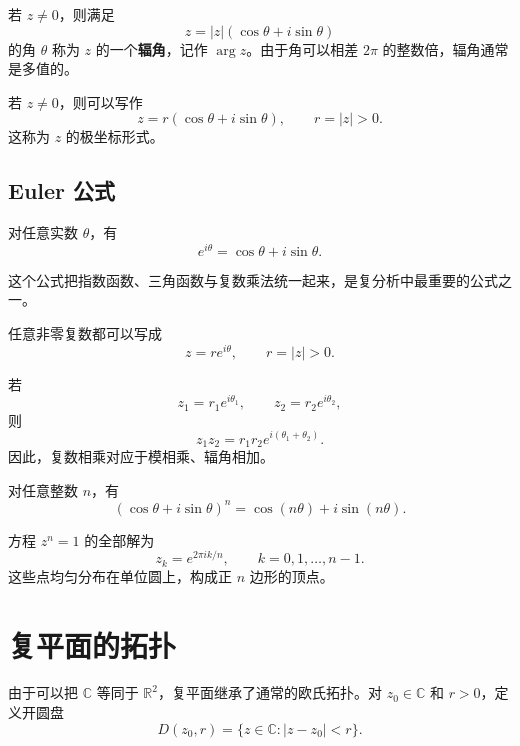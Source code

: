 \begin{definition}[辐角]
若 $z\ne0$，则满足
\[
    z=|z|(\cos\theta+i\sin\theta)
\]
的角 $\theta$ 称为 $z$ 的一个\textbf{辐角}，记作 $\arg z$。由于角可以相差 $2\pi$ 的整数倍，辐角通常是多值的。
\end{definition}

\begin{definition}[极坐标形式]
若 $z\ne0$，则可以写作
\[
    z=r(\cos\theta+i\sin\theta),
    \qquad r=|z|>0.
\]
这称为 $z$ 的极坐标形式。
\end{definition}

\subsection{Euler 公式}

\begin{theorem}[Euler 公式]
对任意实数 $\theta$，有
\[
    e^{i\theta}=\cos\theta+i\sin\theta.
\]
\end{theorem}

这个公式把指数函数、三角函数与复数乘法统一起来，是复分析中最重要的公式之一。

\begin{corollary}[指数形式]
任意非零复数都可以写成
\[
    z=re^{i\theta},
    \qquad r=|z|>0.
\]
\end{corollary}

\begin{proposition}[极坐标形式下的乘法]
若
\[
    z_1=r_1e^{i\theta_1},
    \qquad
    z_2=r_2e^{i\theta_2},
\]
则
\[
    z_1z_2=r_1r_2e^{i(\theta_1+\theta_2)}.
\]
因此，复数相乘对应于模相乘、辐角相加。
\end{proposition}

\begin{theorem}[De Moivre 公式]
对任意整数 $n$，有
\[
    (\cos\theta+i\sin\theta)^n
    =\cos(n\theta)+i\sin(n\theta).
\]
\end{theorem}

\begin{example}[单位根]
方程 $z^n=1$ 的全部解为
\[
    z_k=e^{2\pi i k/n},
    \qquad k=0,1,\dots,n-1.
\]
这些点均匀分布在单位圆上，构成正 $n$ 边形的顶点。
\end{example}

\section{复平面的拓扑}

由于可以把 $\mathbb{C}$ 等同于 $\mathbb{R}^2$，复平面继承了通常的欧氏拓扑。对 $z_0\in\mathbb{C}$ 和 $r>0$，定义开圆盘
\[
    D(z_0,r)=\{z\in\mathbb{C}:|z-z_0|<r\}.
\]

